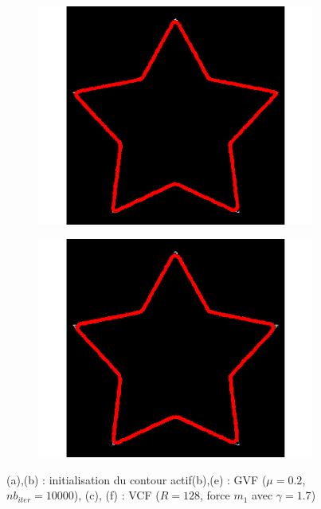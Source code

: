 \begin{figure}[H]
\begin{subfigure}[c]{0.3\linewidth}
\includegraphics[width=\textwidth]{Chapters/Images/Conc/gvfs}
\caption{}
\end{subfigure}
\begin{subfigure}[c]{0.3\linewidth}
\centering
\includegraphics[width=\textwidth]{Chapters/Images/Conc/vfcs}
\caption{}
\end{subfigure}
\caption{(a),(b) : initialisation du contour actif(b),(e) : GVF ($\mu = 0.2$, $nb_{iter} = 10000$), (c), (f) : VCF ($R = 128$, force $m_{1}$ avec $\gamma = 1.7$)}
\end{figure}

